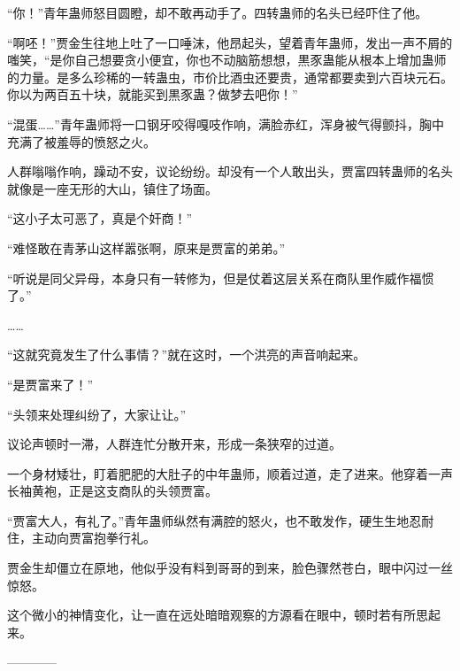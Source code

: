 \begin{this_body}
“你！”青年蛊师怒目圆瞪，却不敢再动手了。四转蛊师的名头已经吓住了他。

“啊呸！”贾金生往地上吐了一口唾沫，他昂起头，望着青年蛊师，发出一声不屑的嗤笑，“是你自己想要贪小便宜，你也不动脑筋想想，黒豕蛊能从根本上增加蛊师的力量。是多么珍稀的一转蛊虫，市价比酒虫还要贵，通常都要卖到六百块元石。你以为两百五十块，就能买到黒豕蛊？做梦去吧你！”

“混蛋……”青年蛊师将一口钢牙咬得嘎吱作响，满脸赤红，浑身被气得颤抖，胸中充满了被羞辱的愤怒之火。

人群嗡嗡作响，躁动不安，议论纷纷。却没有一个人敢出头，贾富四转蛊师的名头就像是一座无形的大山，镇住了场面。

“这小子太可恶了，真是个奸商！”

“难怪敢在青茅山这样嚣张啊，原来是贾富的弟弟。”

“听说是同父异母，本身只有一转修为，但是仗着这层关系在商队里作威作福惯了。”

……

“这就究竟发生了什么事情？”就在这时，一个洪亮的声音响起来。

“是贾富来了！”

“头领来处理纠纷了，大家让让。”

议论声顿时一滞，人群连忙分散开来，形成一条狭窄的过道。

一个身材矮壮，盯着肥肥的大肚子的中年蛊师，顺着过道，走了进来。他穿着一声长袖黄袍，正是这支商队的头领贾富。

“贾富大人，有礼了。”青年蛊师纵然有满腔的怒火，也不敢发作，硬生生地忍耐住，主动向贾富抱拳行礼。

贾金生却僵立在原地，他似乎没有料到哥哥的到来，脸色骤然苍白，眼中闪过一丝惊怒。

这个微小的神情变化，让一直在远处暗暗观察的方源看在眼中，顿时若有所思起来。

------------

\end{this_body}

